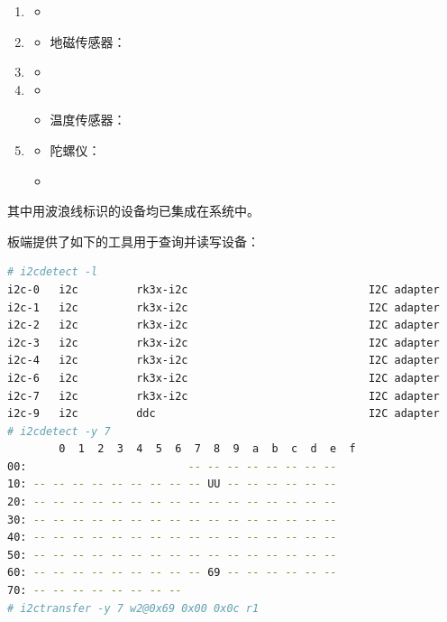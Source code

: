 \documentclass[UTF8]{ctexart}
\begin{document}
\begin{enumerate}
    \item {}
    \begin{itemize}
        \item {}
    \end{itemize}

    \item {}
    \begin{itemize}
        \item 地磁传感器：
    \end{itemize}

    \item {}
    \begin{itemize}
        \item {}
    \end{itemize}

    \item {}
    \begin{itemize}
        \item {}
        \item 温度传感器：
    \end{itemize}

    \item {}
    \begin{itemize}
        \item 陀螺仪：
        \item {}
    \end{itemize}
\end{enumerate}

\noindent 其中用波浪线标识的设备均已集成在系统中。

板端提供了如下的工具用于查询并读写设备：

\begin{lstlisting}[language=sh]
# i2cdetect -l 
i2c-0	i2c       	rk3x-i2c                        	I2C adapter
i2c-1	i2c       	rk3x-i2c                        	I2C adapter
i2c-2	i2c       	rk3x-i2c                        	I2C adapter
i2c-3	i2c       	rk3x-i2c                        	I2C adapter
i2c-4	i2c       	rk3x-i2c                        	I2C adapter
i2c-6	i2c       	rk3x-i2c                        	I2C adapter
i2c-7	i2c       	rk3x-i2c                        	I2C adapter
i2c-9	i2c       	ddc                             	I2C adapter
# i2cdetect -y 7
        0  1  2  3  4  5  6  7  8  9  a  b  c  d  e  f
00:                         -- -- -- -- -- -- -- -- 
10: -- -- -- -- -- -- -- -- -- UU -- -- -- -- -- -- 
20: -- -- -- -- -- -- -- -- -- -- -- -- -- -- -- -- 
30: -- -- -- -- -- -- -- -- -- -- -- -- -- -- -- -- 
40: -- -- -- -- -- -- -- -- -- -- -- -- -- -- -- -- 
50: -- -- -- -- -- -- -- -- -- -- -- -- -- -- -- -- 
60: -- -- -- -- -- -- -- -- -- 69 -- -- -- -- -- -- 
70: -- -- -- -- -- -- -- --                         
# i2ctransfer -y 7 w2@0x69 0x00 0x0c r1
\end{lstlisting}
\end{document}
